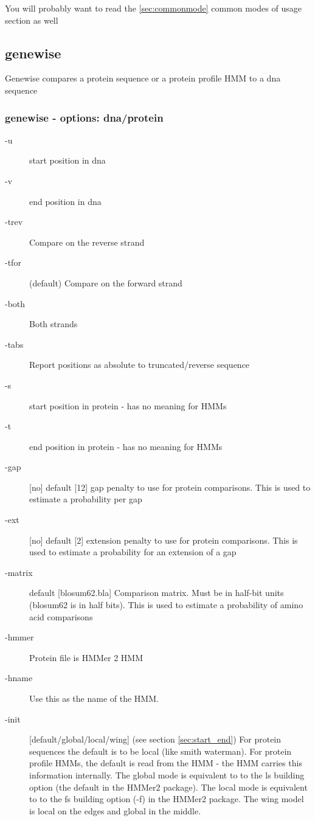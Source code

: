 \documentclass{article}
\begin{document}
You will probably want to read the \ref{sec:commonmode} common modes of usage
section as well



\subsection{genewise}

Genewise compares a protein sequence or a protein profile HMM to a dna sequence

\subsubsection{genewise - options: dna/protein}

\begin{description}
\item[-u]               start position in dna
\item[-v]               end position in dna
\item[-trev]            Compare on the reverse strand
\item[-tfor] (default)  Compare on the forward strand
\item[-both]            Both strands
\item[-tabs]            Report positions as absolute to truncated/reverse sequence
\item[-s]               start position in protein - has no meaning for HMMs
\item[-t]               end   position in protein - has no meaning for HMMs
\item[-gap] [no] default [12]  gap penalty to use for protein comparisons. This
is used to estimate a probability per gap
\item[-ext] [no] default [2]  extension penalty to use for protein comparisons.
This is used to estimate a probability for an extension of a gap
\item[-matrix] default [blosum62.bla]  Comparison matrix. Must be in half-bit
units (blosum62 is in half bits). This is used to estimate a probability of amino
acid comparisons
\item[-hmmer]           Protein file is HMMer 2 HMM
\item[-hname]           Use this as the name of the HMM.
\item[-init]   [default/global/local/wing]  (see section \ref{sec:start_end})
For protein sequences the default is to be local (like
smith waterman). For protein profile HMMs, the default is read from the HMM - the
HMM carries this information internally. The global mode is equivalent to to the ls building option
(the default in the HMMer2 package). The local mode is equivalent to to the fs building option (-f)
in the HMMer2 package. The wing model is local on the edges and global in the middle.
\end{description}
\end{document}
